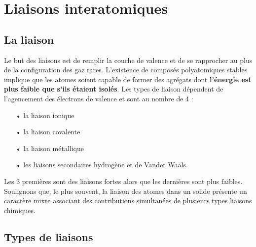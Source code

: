 
\chapter{Liaisons interatomiques}
\section{La liaison}
	Le but des liaisons est de remplir la couche de valence et de se rapprocher au plus de la configuration des gaz rares. L'existence de composés polyatomiques stables implique que les atomes soient capable de former des agrégats dont \textbf{l'énergie est plus faible que s'ils étaient isolés}. Les types de liaison dépendent de l'agencement des électrons de valence et sont au nombre de 4 : \\

\begin{itemize}
	\item[•] la liaison ionique
	\item[•] la liaison covalente
	\item[•] la liaison métallique
	\item[•] les liaisons secondaires hydrogène et de Vander Waals. \\
\end{itemize}
	
Les 3 premières sont des liaisons fortes alors que les dernières sont plus faibles. Soulignons que, le plus souvent, la liaison des atomes dans un solide présente un caractère mixte associant des contributions simultanées de plusieurs types liaisons chimiques.

\section{Types de liaisons}
